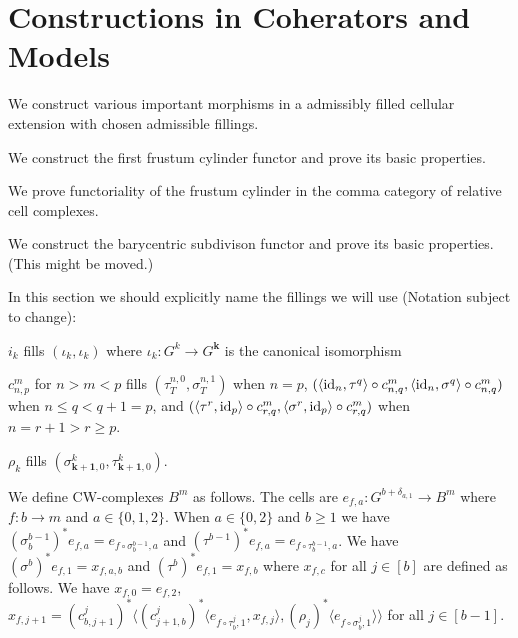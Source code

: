 \section{Constructions in Coherators and Models}\label{sec: constructions in coheratorsandmodels}

We construct various important morphisms in a admissibly filled cellular extension with chosen admissible fillings.

We construct the first frustum cylinder functor and prove its basic properties.

We prove functoriality of the frustum cylinder in the comma category of relative cell complexes.

We construct the barycentric subdivison functor and prove its basic properties. (This might be moved.)

In this section we should explicitly name the fillings we will use (Notation subject to change):

$i_k$ fills $(\iota_k, \iota_k)$ where $\iota_k \colon G^k \to G^{\mathbf{k}}$ is the canonical isomorphism

$c^m_{n, p}$ for $n > m <p$ fills $(\tau_T^{n, 0}, \sigma_T^{n, 1})$ when $n = p$, $(\langle \mathrm{id}_n, \tau^q \rangle \circ c^m_{n, q}, \langle \mathrm{id}_n, \sigma^q \rangle\circ c^m_{n, q})$ when $n \leq q < q+1 = p$, and $(\langle \tau^r, \mathrm{id}_p \rangle \circ c^m_{r, q}, \langle \sigma^r, \mathrm{id}_p \rangle\circ c^m_{r, q})$ when $n = r+1 > r \geq p$.

$\rho_k$ fills $(\sigma^k_{\mathbf{k + 1}, 0}, \tau_{\mathbf{k + 1}, 0}^k)$.

We define CW-complexes $B^m$ as follows. The cells are $e_{f, a} \colon G^{b + \delta_{a,1}} \to B^m$ where $f \colon b \to m$ and $a \in \{0,1,2\}$. When $a \in \{0, 2\}$ and $b \geq 1$ we have $(\sigma^{b - 1}_b)^* e_{f, a} = e_{f \circ \sigma^{b-1}_b, a}$ and $(\tau^{b-1})^* e_{f, a} = e_{f \circ \tau^{b-1}_b, a}$.
We have $(\sigma^{b})^* e_{f, 1} = x_{f, a, b}$ and $(\tau^b)^* e_{f, 1} = x_{f, b}$ where $x_{f, c}$ for all $j \in [b]$ are defined as follows. We have $x_{f,0} = e_{f, 2}$, $x_{f, j + 1} = (c^j_{b, j+1})^* \langle(c^j_{j+1, b})^* \langle e_{f \circ \tau^j_b, 1}, x_{f, j} \rangle, (\rho_{j})^* \langle e_{f \circ \sigma^j_b, 1} \rangle \rangle$ for all $j \in [b - 1]$.

